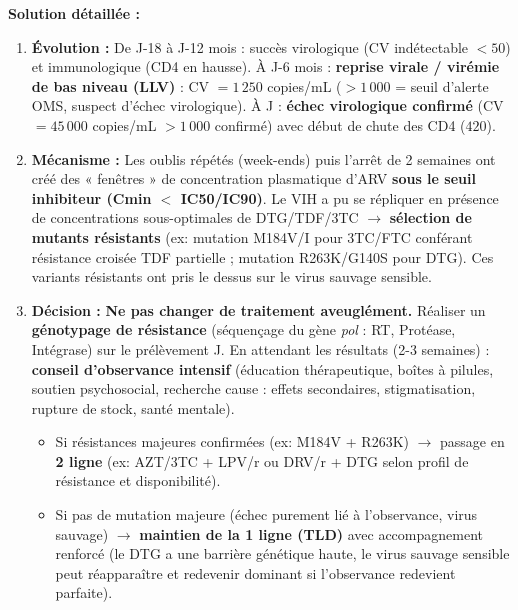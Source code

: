 \documentclass[11pt]{article}
\begin{document}
\begin{exoresolu}
\textbf{Solution détaillée :}
\begin{enumerate}
    \item \textbf{Évolution :} De J-18 à J-12 mois : succès virologique (CV indétectable $< 50$) et immunologique (CD4 en hausse). À J-6 mois : \textbf{reprise virale / virémie de bas niveau (LLV)} : CV $= 1\,250$ copies/mL ($> 1\,000$ = seuil d'alerte OMS, suspect d'échec virologique). À J : \textbf{échec virologique confirmé} (CV $= 45\,000$ copies/mL $> 1\,000$ confirmé) avec début de chute des CD4 ($420$).
    \item \textbf{Mécanisme :} Les oublis répétés (week-ends) puis l'arrêt de 2 semaines ont créé des « fenêtres » de concentration plasmatique d'ARV \textbf{sous le seuil inhibiteur (Cmin $<$ IC50/IC90)}. Le VIH a pu se répliquer en présence de concentrations sous-optimales de DTG/TDF/3TC $\rightarrow$ \textbf{sélection de mutants résistants} (ex: mutation M184V/I pour 3TC/FTC conférant résistance croisée TDF partielle ; mutation R263K/G140S pour DTG). Ces variants résistants ont pris le dessus sur le virus sauvage sensible.
    \item \textbf{Décision :} \textbf{Ne pas changer de traitement aveuglément.} Réaliser un \textbf{génotypage de résistance} (séquençage du gène \emph{pol} : RT, Protéase, Intégrase) sur le prélèvement J. En attendant les résultats (2-3 semaines) : \textbf{conseil d'observance intensif} (éducation thérapeutique, boîtes à pilules, soutien psychosocial, recherche cause : effets secondaires, stigmatisation, rupture de stock, santé mentale). 
    \begin{itemize}
        \item Si résistances majeures confirmées (ex: M184V + R263K) $\rightarrow$ passage en \textbf{2 ligne} (ex: AZT/3TC + LPV/r ou DRV/r + DTG selon profil de résistance et disponibilité).
        \item Si pas de mutation majeure (échec purement lié à l'observance, virus sauvage) $\rightarrow$ \textbf{maintien de la 1 ligne (TLD)} avec accompagnement renforcé (le DTG a une barrière génétique haute, le virus sauvage sensible peut réapparaître et redevenir dominant si l'observance redevient parfaite).
    \end{itemize}
\end{enumerate}
\end{exoresolu}
\end{document}
